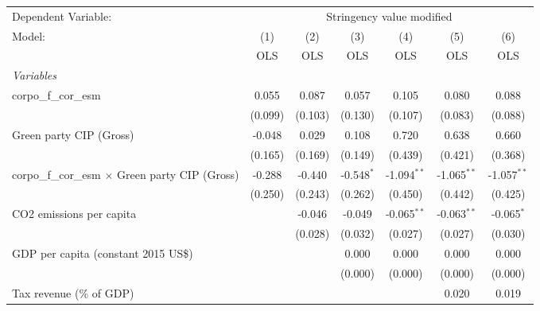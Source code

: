 
\begingroup
\centering
\begin{tabular}{lcccccc}
   \toprule
   Dependent Variable: & \multicolumn{6}{c}{Stringency value modified}\\
   Model:                                                  & (1)     & (2)     & (3)          & (4)           & (5)           & (6)\\  
                                                           &  OLS    & OLS     & OLS          & OLS           & OLS           & OLS\\  
   \midrule
   \emph{Variables}\\
   corpo\_f\_cor\_esm                                      & 0.055   & 0.087   & 0.057        & 0.105         & 0.080         & 0.088\\   
                                                           & (0.099) & (0.103) & (0.130)      & (0.107)       & (0.083)       & (0.088)\\   
   Green party CIP (Gross)                                 & -0.048  & 0.029   & 0.108        & 0.720         & 0.638         & 0.660\\   
                                                           & (0.165) & (0.169) & (0.149)      & (0.439)       & (0.421)       & (0.368)\\   
   corpo\_f\_cor\_esm $\times$ Green party CIP (Gross)     & -0.288  & -0.440  & -0.548$^{*}$ & -1.094$^{**}$ & -1.065$^{**}$ & -1.057$^{**}$\\   
                                                           & (0.250) & (0.243) & (0.262)      & (0.450)       & (0.442)       & (0.425)\\   
   CO2 emissions per capita                                &         & -0.046  & -0.049       & -0.065$^{**}$ & -0.063$^{**}$ & -0.065$^{*}$\\   
                                                           &         & (0.028) & (0.032)      & (0.027)       & (0.027)       & (0.030)\\   
   GDP per capita (constant 2015 US\$)                     &         &         & 0.000        & 0.000         & 0.000         & 0.000\\   
                                                           &         &         & (0.000)      & (0.000)       & (0.000)       & (0.000)\\   
   Tax revenue (\% of GDP)                                 &         &         &              &               & 0.020         & 0.019\\   

\end{tabular}
